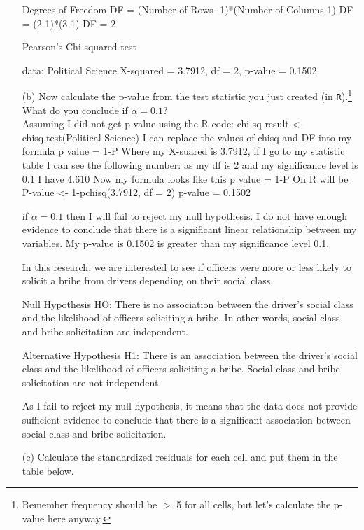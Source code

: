 \documentclass[12pt,letterpaper]{article}
\begin{document}
\begin{enumerate}
	Degrees of Freedom
	DF = (Number of Rows -1)*(Number of Columns-1)
	DF = (2-1)*(3-1)
	DF = 2
	
	Pearson's Chi-squared test
	
	data:  Political Science
	X-squared = 3.7912, df = 2, p-value = 0.1502
	

	
	\item [(b)]
	Now calculate the p-value from the test statistic you just created (in \texttt{R}).\footnote{Remember frequency should be $>$ 5 for all cells, but let's calculate the p-value here anyway.}  What do you conclude if $\alpha = 0.1$?\\
	
	Assuming I did not get p value using the R code: chi-sq-result <- chisq.test(Political-Science)
	I can replace the values of chisq and DF into my formula p value = 1-P%
	Where my X-suared is 3.7912, if I go to my statistic table I can see the following number:
	as my df is 2 and my significance level is 0.1 I have 4.610
	Now my formula looks like this p value = 1-P%
	On R will be P-value <- 1-pchisq(3.7912, df = 2)
	p-value = 0.1502
	
	if $\alpha = 0.1$ then I will fail to reject my null hypothesis. I do not have enough evidence to conclude that there is a significant 
	linear relationship between my variables. My p-value is 0.1502 is greater than my significance level 0.1. 
	
	In this research, we are interested to see if officers were more or less likely to solicit a bribe from drivers depending on their
	social class. 
	
	Null Hypothesis HO: There is no association between the driver's social class and the likelihood of officers soliciting a bribe. In other words, social class and bribe solicitation are independent.
	
	Alternative Hypothesis H1: There is an association between the driver's social class and the likelihood of officers soliciting a bribe. Social class and bribe solicitation are not independent.
	
	As I fail to reject my null hypothesis, it means that the data does not provide sufficient evidence to conclude that there is a significant association between social class and bribe solicitation. 


	
	\newpage
	\item [(c)] Calculate the standardized residuals for each cell and put them in the table below.
	\vspace{1cm}
	


\end{enumerate}
\end{document}
